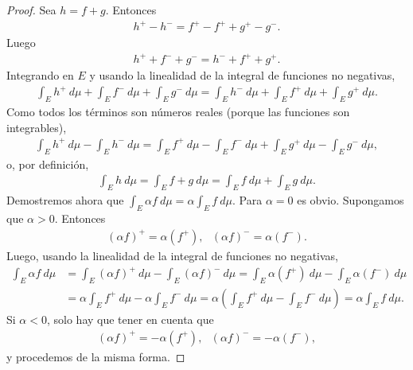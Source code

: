 \begin{proof}
    Sea $h = f + g$. Entonces
    \begin{align*}
        h^+ - h^- = f^+ - f^+ + g^+ - g^-.
    \end{align*}
    Luego
    \begin{align*}
        h^+ + f^- + g^- = h^- + f^+ + g^+.
    \end{align*}
    Integrando en $E$ y usando la linealidad de la integral de funciones no negativas,
    \begin{align*}
        \int_{E}{h^+ \ d\mu} + \int_{E}{f^- \ d\mu} + \int_{E}{g^- \ d\mu} = \int_{E}{h^- \ d\mu} + \int_{E}{f^+ \ d\mu} + \int_{E}{g^+ \ d\mu}.
    \end{align*}
    Como todos los términos son números reales (porque las funciones son integrables),
    \begin{align*}
        \int_{E}{h^+ \ d\mu} - \int_{E}{h^- \ d\mu} = \int_{E}{f^+ \ d\mu} - \int_{E}{f^- \ d\mu} + \int_{E}{g^+ \ d\mu} - \int_{E}{g^- \ d\mu},
    \end{align*}
    o, por definición,
    \begin{align*}
        \int_{E}{h \ d\mu} = \int_{E}{f + g \ d\mu} = \int_{E}{f \ d\mu} + \int_{E}{g \ d\mu}.
    \end{align*}
    Demostremos ahora que $\int_{E}{\alpha f \ d\mu} = \alpha\int_{E}{f \ d\mu}$. Para $\alpha = 0$ es obvio. Supongamos que $\alpha > 0$. Entonces
    \begin{align*}
        (\alpha f)^+ = \alpha(f^+), \ \ \ (\alpha f)^- = \alpha(f^-).
    \end{align*}
    Luego, usando la linealidad de la integral de funciones no negativas,
    \begin{align*}
        \int_{E}{\alpha f \ d\mu} & = \int_{E}{(\alpha f)^+ \ d\mu} - \int_{E}{(\alpha f)^- \ d\mu} = \int_{E}{\alpha (f^+) \ d\mu} - \int_{E}{\alpha (f^-) \ d\mu}                         \\
                                  & = \alpha\int_{E}{f^+ \ d\mu} - \alpha\int_{E}{f^- \ d\mu} = \alpha\left( \int_{E}{f^+ \ d\mu} - \int_{E}{f^- \ d\mu}\right) = \alpha\int_{E}{f \ d\mu}.
    \end{align*}
    Si $\alpha < 0$, solo hay que tener en cuenta que
    \begin{align*}
        (\alpha f)^+ = -\alpha(f^+), \ \ \ (\alpha f)^- = -\alpha(f^-),
    \end{align*}
    y procedemos de la misma forma.
\end{proof}

